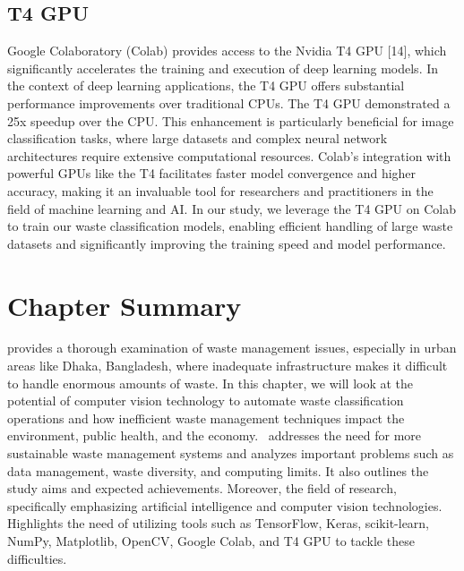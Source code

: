 \subsection{T4 GPU}
Google Colaboratory (Colab) provides access to the Nvidia T4 GPU [14], which significantly accelerates the training and execution of deep learning models. In the context of deep learning applications, the T4 GPU offers substantial performance improvements over traditional CPUs. The T4 GPU demonstrated a 25x speedup over the CPU. This enhancement is particularly beneficial for image classification tasks, where large datasets and complex neural network architectures require extensive computational resources. Colab's integration with powerful GPUs like the T4 facilitates faster model convergence and higher accuracy, making it an invaluable tool for researchers and practitioners in the field of machine learning and AI. In our study, we leverage the T4 GPU on Colab to train our waste classification models, enabling efficient handling of large waste datasets and significantly improving the training speed and model performance.


\section{Chapter Summary}
provides a thorough examination of waste management issues, especially in urban areas like Dhaka, Bangladesh, where inadequate infrastructure makes it difficult to handle enormous amounts of waste. In this chapter, we will look at the potential of computer vision technology to automate waste classification operations and how inefficient waste management techniques impact the environment, public health, and the economy.  addresses the need for more sustainable waste management systems and analyzes important problems such as data management, waste diversity, and computing limits. It also outlines the study aims and expected achievements. Moreover, the field of research, specifically emphasizing artificial intelligence and computer vision technologies. Highlights the need of utilizing tools such as TensorFlow, Keras, scikit-learn, NumPy, Matplotlib, OpenCV, Google Colab, and T4 GPU to tackle these difficulties.
